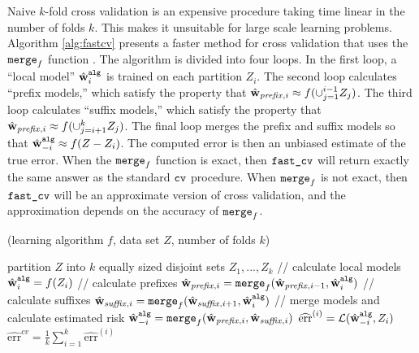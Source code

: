 \documentclass[thesis.tex]{subfiles}
\newcommand{\TO}{{\bfseries to}~}
\newcommand{\set}[1]{\mathcal {#1}}
\newcommand{\mappend}[1]{\oplus_{\set {#1}}}
\newcommand{\riskhat}{\widehat{\textrm{err}}}
\newcommand{\riskcv}{\widehat{\textrm{err}}^\textit{cv}}
\newcommand{\cv}{\mkprocedure{cv}}
\newcommand{\fastcv}{\mkprocedure{fast\_cv}}
\newcommand{\merge}{\mkprocedure{merge}}
\newcommand{\alg}{\mkprocedure{alg}}
\newcommand{\walg}{{\hat\w^{\alg}}}
\newcommand{\wprefix}{{\hat\w_\textit{prefix}}{}}
\newcommand{\wsuffix}{{\hat\w_\textit{suffix}}{}}
\begin{document}
Naive $k$-fold cross validation is an expensive procedure taking time linear in the number of folds $k$.
This makes it unsuitable for large scale learning problems.
Algorithm \ref{alg:fastcv} presents a faster method for cross validation that uses the $\merge_f$ function \citep{izbicki2013algebraic}.
The algorithm is divided into four loops.
In the first loop, a ``local model'' $\walg_i$ is trained on each partition $Z_i$.
The second loop calculates ``prefix models,''
which satisfy the property that $\wprefix_{,i}\approx f(\cup_{j=1}^{i-1} Z_j)$.
The third loop calculates  ``suffix models,''
which satisfy the property that $\wprefix_{,i}\approx f(\cup_{j=i+1}^{k} Z_j)$.
The final loop merges the prefix and suffix models so that
$\walg_{-i}\approx f(Z-Z_i)$.
The computed error is then an unbiased estimate of the true error.
When the $\merge_f$ function is exact,
then $\fastcv$ will return exactly the same answer as the standard $\cv$ procedure.
When $\merge_f$ is not exact,
then $\fastcv$ will be an approximate version of cross validation,
and the approximation depends on the accuracy of $\merge_f$.

\begin{algorithm}[t]
    \caption{\fastcv(learning algorithm $f$, data set $Z$, number of folds $k$)}
    \label{alg:fastcv}
    \vspace{0.1in}
    \begin{algorithmic}[1]
        \State partition $Z$ into $k$ equally sized disjoint sets $Z_1,...,Z_k$
        \State // calculate local models
        \For {$i = 1$ \TO $k$}
            \State $\walg_{i} = f(Z_i)$ 
        \EndFor
        \State // calculate prefixes
        \For {$i = 1$ \TO $k$}
            \State $\wprefix_{,i} = \merge_f(\wprefix_{,i-1}, \walg_i)$ 
        \EndFor
        \State // calculate suffixes
        \For {$i = k$ \TO $1$}
            \State $\wsuffix_{,i} = \merge_f(\wsuffix_{,i+1} , \walg_i)$ 
        \EndFor
        \State // merge models and calculate estimated risk
        \For {$i = 1$ \TO $k$}
            \State $\walg_{-i} = \merge_f(\wprefix_{,i} , \wsuffix_{,i})$
            \State $\riskhat^{(i)} = \Loss(\walg_{-i},Z_i)$
        \EndFor
        \State \Return $\riskcv=\frac 1 k \sum_{i=1}^k \riskhat^{(i)}$
    \end{algorithmic}
\end{algorithm}
\end{document}
